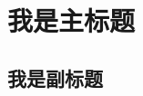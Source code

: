 \documentclass[a4paper]{article}
\begin{document}


\linespread{1.4} \selectfont


\section{我是主标题}

\subsection{我是副标题}
\end{document}
